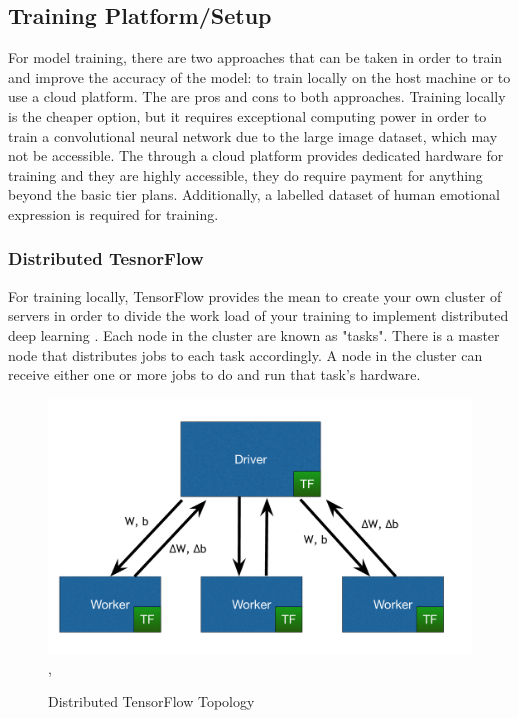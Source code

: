 \subsection*{Training Platform/Setup}
For model training, there are two approaches that can be taken in order to train and improve the accuracy of the model: to train locally on the host machine or to use a cloud platform. The are pros and cons to both approaches. Training locally is the cheaper option, but it requires exceptional computing power in order to train a convolutional neural network due to the large image dataset, which may not be accessible. The through a cloud platform provides dedicated hardware for training and they are highly accessible, they do require payment for anything beyond the basic tier plans. Additionally, a labelled dataset of human emotional expression is required for training.
\subsubsection{Distributed TesnorFlow}
For training locally, TensorFlow provides the mean to create your own cluster of servers in order to divide the work load of your training to implement distributed deep learning \citep{dist}. Each node in the cluster are known as "tasks".  There is a master node that distributes jobs to each task accordingly. A node in the cluster can receive either one or more jobs to do and run that task's hardware.

\begin{figure}[ht]
	\begin{center}
		\advance\leftskip-3cm
		\advance\rightskip-3cm
		\includegraphics[keepaspectratio=true,scale=0.3]{resources/dist.jpg}
		\label{fig: Distributed TensorFlow},
		\caption{Distributed TensorFlow Topology}
		\label{pop}
	\end{center}
\end{figure}

